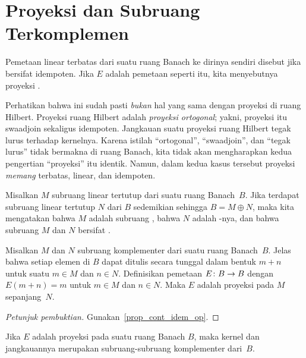 \section{Proyeksi dan Subruang Terkomplemen}
\begin{defn}
 Pemetaan linear terbatas dari suatu ruang Banach ke dirinya sendiri disebut
 jika bersifat idempoten. Jika $E$ adalah pemetaan seperti itu, kita menyebutnya
proyeksi .
\end{defn}

Perhatikan bahwa ini sudah pasti \emph{bukan} hal yang sama dengan proyeksi di
ruang Hilbert. Proyeksi ruang Hilbert adalah \emph{proyeksi ortogonal}; yakni,
proyeksi itu swaadjoin sekaligus idempoten. Jangkauan suatu proyeksi ruang Hilbert
tegak lurus terhadap kernelnya. Karena istilah ``ortogonal'', ``swaadjoin'', dan
``tegak lurus'' tidak bermakna di ruang Banach, kita tidak akan mengharapkan kedua pengertian
``proyeksi'' itu identik. Namun, dalam kedua kasus tersebut proyeksi \emph{memang}
terbatas, linear, dan idempoten.

\begin{defn} Misalkan $M$ subruang linear tertutup dari suatu ruang Banach~$B$. Jika terdapat
subruang linear tertutup $N$ dari $B$ sedemikian sehingga $B = M \oplus N$, maka kita mengatakan bahwa $M$ adalah
subruang , bahwa $N$ adalah
-nya, dan bahwa subruang $M$ dan $N$ bersifat
.
\end{defn}

\begin{prop}\label{C069814} Misalkan $M$ dan $N$ subruang komplementer dari suatu ruang Banach~$B$. Jelas bahwa setiap
elemen di $B$ dapat ditulis secara tunggal dalam bentuk $m + n$ untuk suatu $m \in M$ dan $n \in
N$. Definisikan pemetaan $E \colon B \rightarrow B$ dengan $E(m + n) = m$ untuk $m \in M$ dan $n \in N$.
Maka $E$ adalah proyeksi pada $M$ sepanjang~$N$.
\end{prop}

\begin{proof}[\emph{Petunjuk pembuktian}] Gunakan~\ref{prop_cont_idem_op}.  \ns
\end{proof}

\begin{prop}\label{C069817} Jika $E$ adalah proyeksi pada suatu ruang Banach $B$, maka kernel dan jangkauannya merupakan
subruang-subruang komplementer dari~$B$.
\end{prop}

